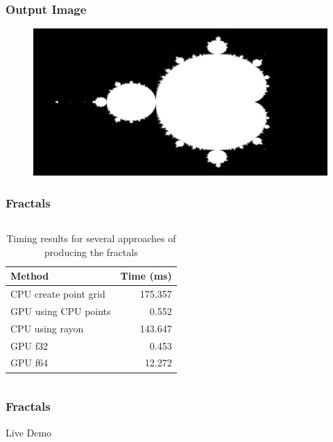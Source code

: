 \documentclass[aspectratio=169]{beamer}
\begin{document}
\begin{frame}
	\frametitle{Output Image}
	\begin{figure}[H]
		\centering
		\includegraphics[width=\textwidth]{./figures/mandelbrot.png}
	\end{figure}
\end{frame}

\begin{frame}
	\frametitle{Fractals}

	\begin{columns}
		\begin{column}{0.5\textwidth}
			\begin{table}[ht]
                \centering
                \caption{Timing results for several approaches of producing the fractals}
				\begin{tabular}{l r}
					\toprule
					Method                & Time (ms) \\
					\midrule
					CPU create point grid & 175.357   \\
					GPU using CPU points  & 0.552     \\
					CPU using rayon       & 143.647   \\
					\midrule
					GPU f32               & 0.453     \\
					GPU f64               & 12.272    \\
					\bottomrule
				\end{tabular}
			\end{table}
		\end{column}
	\end{columns}
\end{frame}

\begin{frame}
	\frametitle{Fractals}

	\centering
	\huge Live Demo
\end{frame}

\printbibliography
\end{document}
